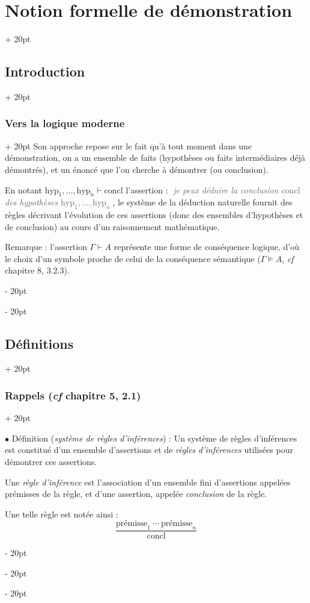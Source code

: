 \documentclass[a4paper, 12pt, twoside]{article}
\newcommand{\simplecit}[1]{\guillemotleft$\;$#1$\;$\guillemotright}
\newcommand{\cit}[1]{\simplecit{\textcolor{656565}{#1}}}
\newcommand{\quo}[1]{\cit{\it #1}}
\newcommand{\ind}[1][20pt]{\advance\leftskip + #1}
\newcommand{\deind}[1][20pt]{\advance\leftskip - #1}
\newenvironment{indt}[2][20pt]{#2 \par \ind[#1]}{\par \deind} %
\begin{document}
\begin{indt}{\section{Notion formelle de démonstration}}
\begin{indt}{\subsection{Introduction}}
\begin{indt}{\subsubsection{Vers la logique moderne}}
                Son approche repose sur le fait qu'à tout moment dans une démonstration, on a un ensemble de faits (hypothèses ou faits intermédiaires déjà démontrés), et un énoncé que l'on cherche à démontrer (ou conclusion).

                En notant $\mathrm{hyp}_1, \ldots, \mathrm{hyp}_n \vdash \mathrm{concl}$ l'assertion : \quo{je peux déduire la conclusion $\mathrm{concl}$ des hypothèses $\mathrm{hyp}_1, \ldots, \mathrm{hyp}_n$}, le système de la déduction naturelle fournit des règles décrivant l'évolution de ces assertions (donc des ensembles d'hypothèses et de conclusion) au cours d'un raisonnement mathématique.

                \vspace{12pt}
                
                Remarque : l'assertion $\Gamma \vdash A$ représente une forme de conséquence logique, d'où le choix d'un symbole proche de celui de la conséquence sémantique ($\Gamma \vDash A$, \textit{cf} chapitre 8, 3.2.3).
            \end{indt}
        \end{indt}

        \vspace{12pt}
        
        \begin{indt}{\subsection{Définitions}}
            \begin{indt}{\subsubsection{Rappels (\textit{cf} chapitre 5, 2.1)}}
                \label{1.2.1}

                $\bullet$ Définition (\emph{système de règles d'inférences}) :
                Un système de règles d'inférences est constitué d'un ensemble d'assertions et de \emph{règles d'inférences} utilisées pour démontrer ces assertions.

                Une \emph{règle d'inférence} est l'association d'un ensemble fini d'assertions appelées prémisses de la règle, et d'une assertion, appelée \emph{conclusion} de la règle.

                Une telle règle est notée ainsi :
                \[
                    \dfrac{\text{prémisse}_1\ \cdots\ \text{prémisse}_n}{\mathrm{concl}}
                \]


\end{indt}
\end{indt}
\end{indt}
\end{document}
